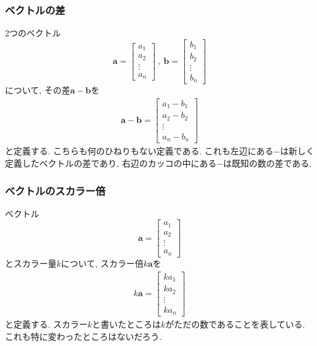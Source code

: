 \subsubsection{ベクトルの差}
2つのベクトル
$$
\bm{a} = \left[
 \begin{array}{c}
   a_1 \\
   a_2 \\
   \vdots \\
   a_n 
 \end{array}
            \right]
\ , \ 
\bm{b} = \left[
 \begin{array}{c}
   b_1 \\
   b_2 \\
   \vdots \\
   b_n 
 \end{array}
            \right]
$$
について, その差$\bm{a}-\bm{b}$を
\begin{eqnarray}
\bm{a}-\bm{b} = \left[
 \begin{array}{c}
   a_1-b_1 \\
   a_2-b_2 \\
   \vdots \\
   a_n-b_n 
 \end{array}
\right]
\label{eqn:vecsa}
\end{eqnarray}
と定義する. こちらも何のひねりもない定義である. 
これも左辺にある$-$は新しく定義したベクトルの差であり, 右辺のカッコの中にある$-$は既知の数の差である. 
\subsubsection{ベクトルのスカラー倍}
ベクトル
$$
\bm{a} = \left[
 \begin{array}{c}
   a_1 \\
   a_2 \\
   \vdots \\
   a_n 
 \end{array}
\right]
$$
とスカラー量$k$について, スカラー倍$k\bm{a}$を
\begin{eqnarray}
k\bm{a} = \left[
 \begin{array}{c}
   ka_1 \\
   ka_2 \\
   \vdots \\
   ka_n 
 \end{array}
\right]
\label{eq:vecsukara}
\end{eqnarray}
と定義する. スカラー$k$と書いたところは$k$がただの数であることを表している. 
これも特に変わったところはないだろう. 

